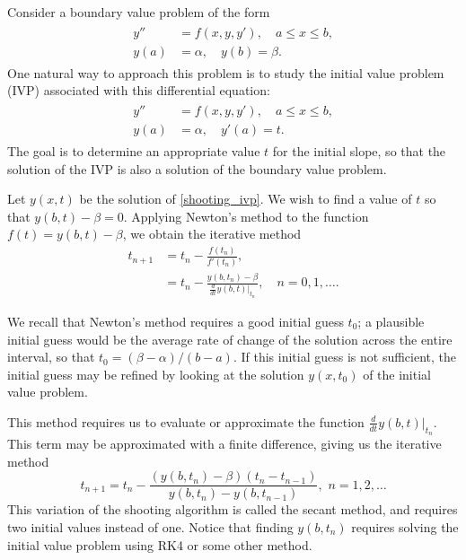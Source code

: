 \label{lab:Shooting}

Consider a boundary value problem of the form 
\begin{align}
	\label{shooting_bvp}
	\begin{split}
y'' &= f(x,y,y'), \quad a \leq x \leq b, \\
y(a) &= \alpha, \quad y(b) = \beta. 
\end{split}
\end{align}
One natural way to approach this problem is to study the initial value problem (IVP) associated with this differential equation: 
\begin{align}
	\label{shooting_ivp}
	\begin{split}
y'' &= f(x,y,y'), \quad a \leq x \leq b, \\
y(a) &= \alpha, \quad y'(a) = t. 
	\end{split}
\end{align}
The goal is to determine an  appropriate value $t$ for the initial slope, so that the solution of the IVP is also a solution of the boundary value problem. 

Let $y(x,t)$ be the solution of \eqref{shooting_ivp}. We wish to find a value of $t$ so that 
$y(b,t) - \beta = 0$. 
Applying Newton's method to the function $f(t) = y(b,t) - \beta$, we obtain the iterative method 
\begin{align*}
	t_{n+1} &= t_n - \frac{ f(t_n)}{f'(t_n) }, \\
	&= t_n - \frac{ y(b,t_n) - \beta}{\frac{d}{dt} \left.y(b,t)\right|_{t_n} },\quad n = 0,1,\ldots .
\end{align*}

We recall that Newton's method requires a good initial guess $t_0$; a plausible initial guess would be the average rate of change of the solution across the entire interval, so that $t_0 =  (\beta - \alpha)/(b-a)$.
If this initial guess is not sufficient, the initial guess may be refined by looking at the solution $y(x,t_0)$ of the initial value problem.

This method requires us to evaluate or approximate the function $\frac{d}{dt} \left.y(b,t)\right|_{t_n}$.
This term may be approximated with a finite difference, giving us the iterative method
\[t_{n+1} = t_n - \frac{ (y(b,t_n) - \beta)(t_n - t_{n-1})}{y(b,t_n) - y(b,t_{n-1}) }, \,\, n = 1, 2,\hdots\]
This variation of the shooting algorithm is called the secant method, and requires two initial values instead of one.
Notice that finding $y(b,t_n)$ requires solving the initial value problem using RK4 or some other method.

